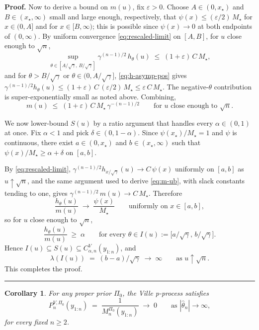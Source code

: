 \documentclass{article}%
\newtheorem{corollary}[theorem]{Corollary}
\newenvironment{proof}[1][Proof]{\noindent\textbf{#1.} }{\ \rule{0.5em}{0.5em}}
\newcommand{\1}{\mathbf{1}}
\begin{document}
\begin{proof}
Now to derive a bound on $m(u)$, fix $\varepsilon > 0$. Choose $A \in (0, x_\star)$
and $B \in (x_\star, \infty)$ small and large enough, respectively, that
$\psi(x) \leq (\varepsilon/2)\, M_\star$ for $x \in (0, A]$ and for $x \in [B,\infty)$;
this is possible since $\psi(x) \to 0$ at both endpoints of $(0,\infty)$.
By uniform convergence \eqref{eq:rescaled-limit} on $[A,B]$, for $u$ close
enough to $\sqrt n$,
\begin{equation}\label{eq:on-compact-ub}
  \sup_{\theta \in [A/\sqrt\gamma,\,B/\sqrt\gamma]}
    \gamma^{(n-1)/2}\,h_\theta(u)
  \;\leq\; (1+\varepsilon)\,C\,M_\star,
\end{equation}
and for $\theta > B/\sqrt\gamma$ or $\theta \in (0, A/\sqrt\gamma]$,
\eqref{eq:h-asymp-pos} gives
$\gamma^{(n-1)/2} h_\theta(u) \leq (1+\varepsilon)\, C\, (\varepsilon/2)\, M_\star
 \leq \varepsilon\, C\, M_\star$.
The negative-$\theta$ contribution is super-exponentially small as noted
above. Combining,
\begin{equation}\label{eq:m-ub}
  m(u) \;\leq\; (1+\varepsilon)\,C\,M_\star\,\gamma^{-(n-1)/2}
  \qquad \text{for } u \text{ close enough to } \sqrt n.
\end{equation}

We now lower-bound $S(u)$ by a ratio argument that handles every
$\alpha \in (0,1)$ at once. Fix $\alpha < 1$ and pick
$\delta \in (0, 1-\alpha)$. Since $\psi(x_\star)/M_\star = 1$ and $\psi$
is continuous, there exist $a \in (0, x_\star)$ and $b \in (x_\star, \infty)$
such that $\psi(x)/M_\star \geq \alpha + \delta$ on $[a,b]$.

By \eqref{eq:rescaled-limit}, $\gamma^{(n-1)/2} h_{x/\sqrt\gamma}(u) \to C\,\psi(x)$
uniformly on $[a,b]$ as $u\uparrow\sqrt n$, and the same argument used to
derive \eqref{eq:m-ub}, with slack constants tending to one, gives
$\gamma^{(n-1)/2}\,m(u) \to C\,M_\star$. Therefore
\[
   \frac{h_\theta(u)}{m(u)}
   \;\longrightarrow\;\frac{\psi(x)}{M_\star}
   \qquad\text{uniformly on } x \in [a,b],
\]
so for $u$ close enough to $\sqrt n$,
\[
   \frac{h_\theta(u)}{m(u)} \;\geq\; \alpha
   \qquad\text{for every } \theta \in I(u) := \bigl[a/\sqrt\gamma,\, b/\sqrt\gamma\bigr].
\]
Hence $I(u) \subseteq S(u) \subseteq C_{\alpha,n}^V(y_{1:n})$, and
\[
   \lambda(I(u)) \;=\; (b-a)/\sqrt\gamma \;\longrightarrow\;\infty
   \qquad\text{as } u\uparrow\sqrt n.
\]
This completes the proof.
\end{proof}

\begin{corollary}\label{cor:Ville-pdegen}
For any proper prior \(\Pi_0\), the Ville p-process satisfies
\[
  P_n^{V,\Pi_0}(y_{1:n})\;=\;\frac{1}{M_n^{\Pi_0}(y_{1:n})}
  \;\longrightarrow\;0\qquad\text{as }|\widehat\theta_n|\to\infty,
\]
for every fixed \(n\geq 2\).
\end{corollary}
\end{document}
